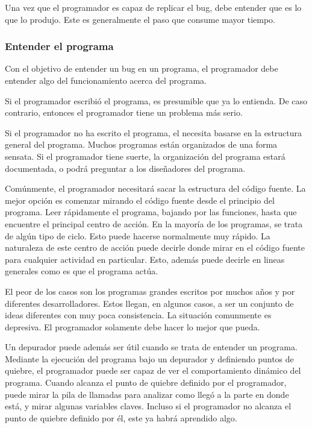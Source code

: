 \documentclass[12pt,legalpaper]{report}
\begin{document}
Una vez que el programador es capaz de replicar el bug, debe entender que es lo que lo produjo.  Este es generalmente el paso que consume mayor tiempo.


\subsubsection{Entender el programa}

Con el objetivo de entender un bug en un programa, el programador debe entender algo del funcionamiento acerca del programa.

Si el programador escribió el programa, es presumible que ya lo entienda.  De caso contrario, entonces el programador tiene un problema más serio.

Si el programador no ha escrito el programa, el necesita basarse en la estructura general del programa.  Muchos programas están organizados de una forma sensata.  Si el programador tiene suerte, la organización del programa estará documentada, o podrá preguntar a los diseñadores del programa.

Comúnmente, el programador necesitará sacar la estructura del código fuente.  La mejor opción es comenzar mirando el código fuente desde el principio del programa.  Leer rápidamente el programa, bajando por las funciones, hasta que encuentre el principal centro de acción.  En la mayoría de los programas, se trata de algún tipo de ciclo.  Esto puede hacerse normalmente  muy rápido.  La naturaleza de este centro de acción puede decirle donde mirar en el código fuente para cualquier actividad en particular.  Esto, además puede decirle en lineas generales como es que el programa actúa.

El peor de los casos son los programas grandes escritos por muchos años y por diferentes desarrolladores.  Estos llegan, en algunos casos, a ser un conjunto de ideas diferentes con muy poca consistencia.  La situación comunmente es depresiva.  El programador solamente debe hacer lo mejor que pueda.

Un depurador puede además ser útil cuando se trata de entender un programa.  Mediante la ejecución del programa bajo un depurador y definiendo puntos de quiebre, el programador puede ser capaz de ver el comportamiento dinámico del programa.  Cuando alcanza el punto de quiebre definido por el programador, puede mirar la pila de llamadas para analizar como llegó a la parte en donde está, y mirar algunas variables claves.  Incluso si el programador no alcanza el punto de quiebre definido por él, este ya habrá aprendido algo.
\end{document}
